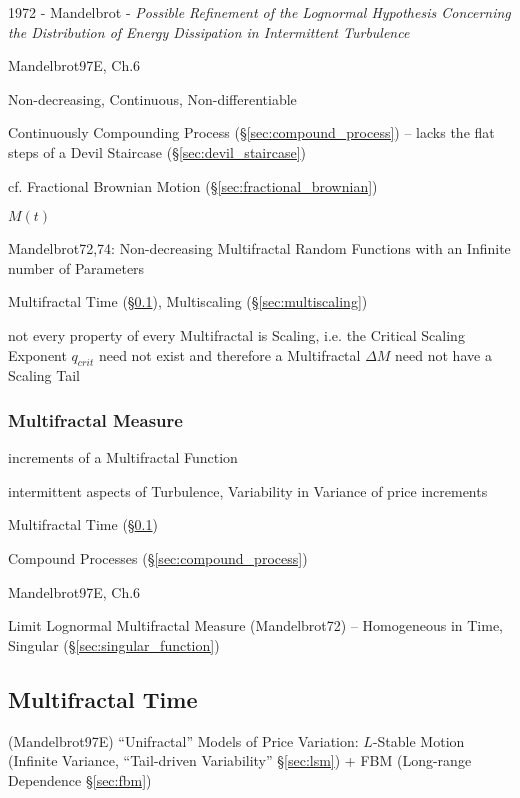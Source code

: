 1972 - Mandelbrot - \emph{Possible Refinement of the Lognormal Hypothesis
  Concerning the Distribution of Energy Dissipation in Intermittent Turbulence}

Mandelbrot97E, Ch.6

Non-decreasing, Continuous, Non-differentiable

Continuously Compounding Process (\S\ref{sec:compound_process})
-- lacks the flat steps of a Devil Staircase (\S\ref{sec:devil_staircase})

cf. Fractional Brownian Motion (\S\ref{sec:fractional_brownian})

$M(t)$

Mandelbrot72,74: Non-decreasing Multifractal Random Functions with an Infinite
number of Parameters

Multifractal Time (\S\ref{sec:multifractal_time}), Multiscaling
(\S\ref{sec:multiscaling})

not every property of every Multifractal is Scaling, i.e. the Critical Scaling
Exponent $q_{crit}$ need not exist and therefore a Multifractal $\Delta M$ need
not have a Scaling Tail



\subsubsection{Multifractal Measure}\label{sec:multifractal_measure}

increments of a Multifractal Function

intermittent aspects of Turbulence, Variability in Variance of price increments

Multifractal Time (\S\ref{sec:multifractal_time})

Compound Processes (\S\ref{sec:compound_process})

Mandelbrot97E, Ch.6

Limit Lognormal Multifractal Measure (Mandelbrot72) -- Homogeneous in Time,
Singular (\S\ref{sec:singular_function})



\subsection{Multifractal Time}\label{sec:multifractal_time}

(Mandelbrot97E) ``Unifractal'' Models of Price Variation: $L$-Stable Motion
(Infinite Variance, ``Tail-driven Variability'' \S\ref{sec:lsm}) + FBM
(Long-range Dependence \S\ref{sec:fbm})

